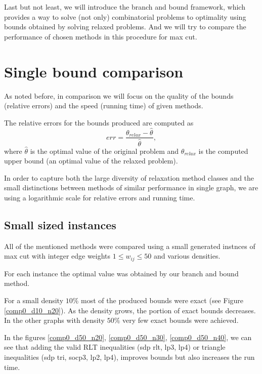 \documentclass[12pt]{book}
\theoremstyle{definition}
\begin{document}
Last but not least, we will introduce the branch and bound framework, which provides a way to solve (not only) combinatorial problems to optimality using bounds obtained by solving relaxed problems. And we will try to compare the performance of chosen methods in this procedure for max cut.

\section{Single bound comparison}

As noted before, in comparison we will focus on the quality of the bounds (relative errors) and the speed (running time) of given methods.

The relative errors for the bounds produced are computed as 
\begin{equation}
\label{relative_error}
err = \frac{\theta_{relax} - \hat{\theta}}{\hat{\theta}},
\end{equation}
where $\hat{\theta}$ is the optimal value of the original problem and $\theta_{relax}$ is the computed upper bound (an optimal value of the relaxed problem). 

In order to capture both the large diversity of relaxation method classes and the small distinctions between methods of similar performance in single graph, we are using a logarithmic scale for relative errors and running time. 



\subsection{Small sized instances}
All of the mentioned methods were compared using a small generated instnces of max cut with integer edge weights $1\leq w_{ij}\leq 50$
and various densities. 

For each instance the optimal value was obtained by our branch and bound method. 

For a small density $10\%$ most of the produced bounds were exact (see Figure \ref{comp0_d10_n20}). 
As the density grows, the portion of exact bounds decreases. In the other graphs with density $50\%$ very few exact bounds were achieved.

In the figures \ref{comp0_d50_n20}, \ref{comp0_d50_n30}, \ref{comp0_d50_n40}, we can see that adding the valid RLT inequalities (sdp rlt, lp3, lp4) or triangle inequalities (sdp tri, socp3, lp2, lp4), improves bounds but also increases the run time.
\end{document}
